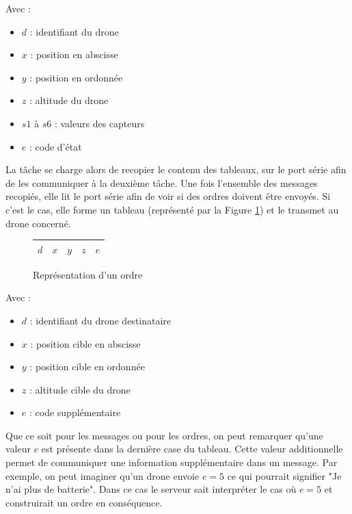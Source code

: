 \documentclass[a4paper,10pt]{report}
\begin{document}
	Avec :
	\begin{itemize}
	  \item $d$ : identifiant du drone
	  \item $x$ : position en abscisse
	  \item $y$ : position en ordonnée
	  \item $z$ : altitude du drone
	  \item $s1$ à $s6$ : valeurs des capteurs
	  \item $e$ : code d'état
	\end{itemize}

	La tâche se charge alors de recopier le contenu des tableaux, sur le 
port série afin de les communiquer à la deuxième tâche. Une fois l'ensemble des 
messages recopiés, elle lit le port série afin de voir si des ordres doivent 
être envoyés. Si c'est le cas, elle forme un tableau (représenté par la 
Figure \ref{message_serveur}) et le transmet au drone concerné.

	\begin{figure}
	  \begin{center}
	    \begin{tabular}{|c|c|c|c|c|}
	      \hline
	      $d$ & $x$ & $y$ & $z$ & $e$ \\
	      \hline
	    \end{tabular}
	  \end{center}
	  \label{message_serveur}
	  \caption{Représentation d'un ordre}
	\end{figure}
	
	Avec :
	\begin{itemize}
	  \item $d$ : identifiant du drone destinataire
	  \item $x$ : position cible en abscisse
	  \item $y$ : position cible en ordonnée
	  \item $z$ : altitude cible du drone
	  \item $e$ : code supplémentaire
	\end{itemize}
	
	Que ce soit pour les messages ou pour les ordres, on peut remarquer 
qu'une valeur $e$ est présente dans la dernière case du tableau. Cette valeur 
additionnelle permet de communiquer une information supplémentaire dans un 
message. Par exemple, on peut imaginer qu'un drone envoie $e = 5$ ce qui 
pourrait signifier "Je n'ai plus de batterie". Dans ce cas le serveur sait 
interpréter le cas où $e = 5$ et construirait un ordre en conséquence.
\end{document}
